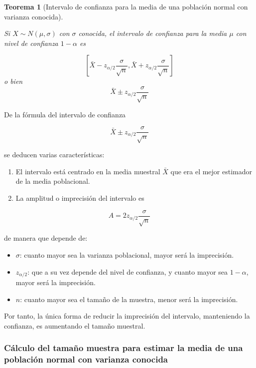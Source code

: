\documentclass[
  a4paper,
]{scrreport}
\providecommand{\tightlist}{%
  \setlength{\itemsep}{0pt}\setlength{\parskip}{0pt}}\usepackage{longtable,booktabs,array}
\theoremstyle{definition}
\theoremstyle{definition}
\theoremstyle{plain}
\newtheorem{theorem}{Teorema}[chapter]
\theoremstyle{remark}
\begin{document}
\begin{theorem}[Intervalo de confianza para la media de una población
normal con varianza
conocida]\protect\hypertarget{thm-intervalo-confianza-media-normal-varianza-conocida}{}\label{thm-intervalo-confianza-media-normal-varianza-conocida}

Si \(X\sim N(\mu, \sigma)\) con \(\sigma\) conocida, el \emph{intervalo
de confianza para la media} \(\mu\) con nivel de confianza \(1-\alpha\)
es

\[
\left[\bar{X}-z_{\alpha/2}\frac{\sigma}{\sqrt{n}},\bar{X}+z_{\alpha/2}\frac{\sigma}{\sqrt{n}}\right]
\] o bien \[
\bar{X}\pm z_{\alpha/2}\frac{\sigma}{\sqrt{n}}
\]

\end{theorem}

De la fórmula del intervalo de confianza

\[
\bar{X}\pm z_{\alpha/2}\frac{\sigma}{\sqrt{n}}
\]

se deducen varias características:

\begin{enumerate}
\def\labelenumi{\alph{enumi}.}
\item
  El intervalo está centrado en la media muestral \(\bar X\) que era el
  mejor estimador de la media poblacional.
\item
  La amplitud o imprecisión del intervalo es
\end{enumerate}

\[
A= 2 z_{\alpha/2}\frac{\sigma}{\sqrt{n}}
\]

de manera que depende de:

\begin{itemize}
\tightlist
\item
  \(\sigma\): cuanto mayor sea la varianza poblacional, mayor será la
  imprecisión.
\item
  \(z_{\alpha/2}\): que a su vez depende del nivel de confianza, y
  cuanto mayor sea \(1-\alpha\), mayor será la imprecisión.
\item
  \(n\): cuanto mayor sea el tamaño de la muestra, menor será la
  imprecisión.
\end{itemize}

Por tanto, la única forma de reducir la imprecisión del intervalo,
manteniendo la confianza, es aumentando el tamaño muestral.

\hypertarget{cuxe1lculo-del-tamauxf1o-muestra-para-estimar-la-media-de-una-poblaciuxf3n-normal-con-varianza-conocida}{%
\subsubsection{Cálculo del tamaño muestra para estimar la media de una
población normal con varianza
conocida}\label{cuxe1lculo-del-tamauxf1o-muestra-para-estimar-la-media-de-una-poblaciuxf3n-normal-con-varianza-conocida}}
\end{document}
